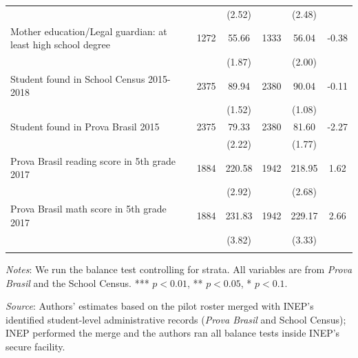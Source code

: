 \documentclass[
	article,			%
	12pt,				%
	oneside,			%
	a4paper,			%
	]{article}
\begin{document}
\begin{table}[h!]
\begin{threeparttable}
\begin{tabular*}{\textwidth}{@{\extracolsep{\fill}}lccccc@{}}
           &            &     (2.52) &            &     (2.48) &            \\

Mother education/Legal guardian: at least high school degree &       1272 &      55.66 &       1333 &      56.04 &      -0.38 \\

           &            &     (1.87) &            &     (2.00) &            \\

Student found in School Census 2015-2018 &       2375 &      89.94 &       2380 &      90.04 &      -0.11 \\

           &            &     (1.52) &            &     (1.08) &            \\

Student found in Prova Brasil 2015 &       2375 &      79.33 &       2380 &      81.60 &      -2.27 \\

           &            &     (2.22) &            &     (1.77) &            \\

Prova Brasil reading score in 5th grade 2017 &       1884 &     220.58 &       1942 &     218.95 &       1.62 \\

           &            &     (2.92) &            &     (2.68) &            \\

Prova Brasil math score in 5th grade 2017 &       1884 &     231.83 &       1942 &     229.17 &       2.66 \\

           &            &     (3.82) &            &     (3.33) &            \\

           &            &            &            &            &            \\


\bottomrule
\end{tabular*}
\begin{tablenotes}
\fontsize{9}{9}\selectfont
\item \textit{Notes}: We run the balance test controlling for strata. All variables are from \textit{Prova Brasil} and the School Census. *** $p<0.01$, ** $p<0.05$, * $p<0.1$.
\item \textit{Source}: Authors' estimates based on the pilot roster merged with INEP's identified student-level administrative records (\textit{Prova Brasil} and School Census); INEP performed the merge and the authors ran all balance tests inside INEP's secure facility.
\end{tablenotes}
\end{threeparttable}
\end{table}
\restoregeometry
\end{document}
